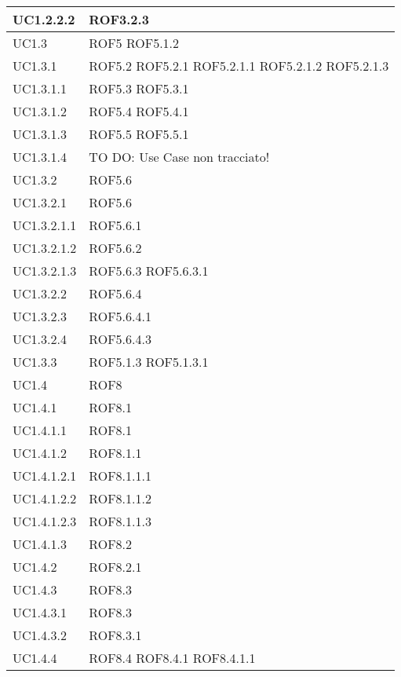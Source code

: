 \begin{center}
\begin{longtable}{| p{4cm} | p{4cm} |}
UC1.2.2.2 & ROF3.2.3 \\
\hline
UC1.3 & ROF5 \newline ROF5.1.2 \\
\hline
UC1.3.1 & ROF5.2 \newline ROF5.2.1 \newline ROF5.2.1.1 \newline ROF5.2.1.2 \newline ROF5.2.1.3 \\
\hline
UC1.3.1.1 & ROF5.3 \newline ROF5.3.1 \\
\hline
UC1.3.1.2 & ROF5.4 \newline ROF5.4.1 \\
\hline
UC1.3.1.3 & ROF5.5 \newline ROF5.5.1 \\
\hline
UC1.3.1.4 & TO DO: Use Case non tracciato! \\
\hline
UC1.3.2 & ROF5.6 \\
\hline
UC1.3.2.1 & ROF5.6 \\
\hline
UC1.3.2.1.1 & ROF5.6.1 \\
\hline
UC1.3.2.1.2 & ROF5.6.2 \\
\hline
UC1.3.2.1.3 & ROF5.6.3 \newline ROF5.6.3.1 \\
\hline
UC1.3.2.2 & ROF5.6.4 \\
\hline
UC1.3.2.3 & ROF5.6.4.1 \\
\hline
UC1.3.2.4 & ROF5.6.4.3 \\
\hline
UC1.3.3 & ROF5.1.3 \newline ROF5.1.3.1 \\
\hline
UC1.4 & ROF8 \\
\hline
UC1.4.1 & ROF8.1 \\
\hline
UC1.4.1.1 & ROF8.1 \\
\hline
UC1.4.1.2 & ROF8.1.1 \\
\hline
UC1.4.1.2.1 & ROF8.1.1.1 \\
\hline
UC1.4.1.2.2 & ROF8.1.1.2 \\
\hline
UC1.4.1.2.3 & ROF8.1.1.3 \\
\hline
UC1.4.1.3 & ROF8.2 \\
\hline
UC1.4.2 & ROF8.2.1 \\
\hline
UC1.4.3 & ROF8.3 \\
\hline
UC1.4.3.1 & ROF8.3 \\
\hline
UC1.4.3.2 & ROF8.3.1 \\
\hline
UC1.4.4 & ROF8.4 \newline ROF8.4.1 \newline ROF8.4.1.1 \\

\end{longtable}
\end{center}
